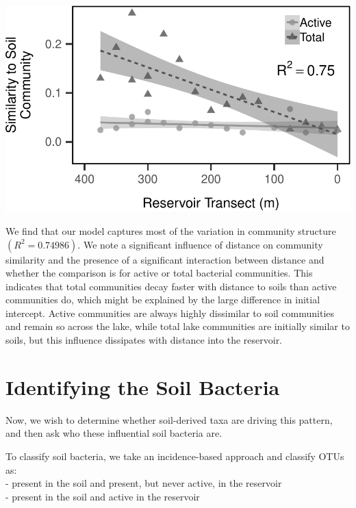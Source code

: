 \documentclass[]{article}
\begin{document}
\begin{center}\includegraphics{ReservoirGradient_files/figure-latex/plot_similarity_to_soils-1} \end{center}

We find that our model captures most of the variation in community
structure \((R^2 = 0.74986)\). We note a significant influence of
distance on community similarity and the presence of a significant
interaction between distance and whether the comparison is for active or
total bacterial communities. This indicates that total communities decay
faster with distance to soils than active communities do, which might be
explained by the large difference in initial intercept. Active
communities are always highly dissimilar to soil communities and remain
so across the lake, while total lake communities are initially similar
to soils, but this influence dissipates with distance into the
reservoir.

\section{Identifying the Soil
Bacteria}\label{identifying-the-soil-bacteria}

Now, we wish to determine whether soil-derived taxa are driving this
pattern, and then ask who these influential soil bacteria are.

To classify soil bacteria, we take an incidence-based approach and
classify OTUs as:\\
- present in the soil and present, but never active, in the reservoir\\
- present in the soil and active in the reservoir
\end{document}
